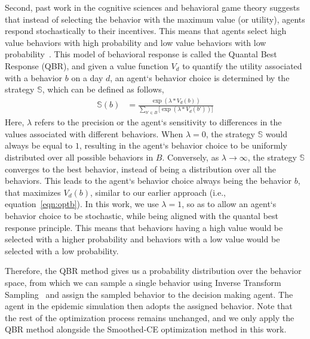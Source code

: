\documentclass[doublespace]{VTthesis}
\begin{document}
    Second, past work in the cognitive sciences and behavioral game theory suggests that instead of selecting the behavior with the maximum value (or utility), agents respond stochastically to their incentives. This means that agents select high value behaviors with high probability and low value behaviors with low probability~\cite{wright2014level}. This model of behavioral response is called the Quantal Best Response (QBR), and given a value function $V_d$ to quantify the utility associated with a behavior $b$ on a day $d$, an agent`s behavior choice is determined by the strategy $\mathbb{S}$, which can be defined as follows,
    \begin{align}
        \mathbb{S}(b) &= \frac{\exp (\lambda * V_d(b)) }{ \sum\limits_{b' \in B} \big[ \exp(\lambda * V_d(b')) \big]}
    	\label{eqn:qbr}
    \end{align}
    Here, $\lambda$ refers to the precision or the agent`s sensitivity to differences in the values associated with different behaviors. When $\lambda = 0$, the strategy $\mathbb{S}$ would always be equal to $1$, resulting in the agent`s behavior choice to be uniformly distributed over all possible behaviors in $B$. Conversely, as $\lambda \rightarrow \infty$, the strategy $\mathbb{S}$ converges to the best behavior, instead of being a distribution over all the behaviors. This leads to the agent`s behavior choice always being the behavior $b$, that maximizes $V_d(b)$, similar to our earlier approach (i.e., equation~\ref{eqn:optb}). In this work, we use $\lambda = 1$, so as to allow an agent`s behavior choice to be stochastic, while being aligned with the quantal best response principle. This means that behaviors having a high value would be selected with a higher probability and behaviors with a low value would be selected with a low probability.
    
    Therefore, the QBR method gives us a probability distribution over the behavior space, from which we can sample a single behavior using Inverse Transform Sampling~\cite{wiki:its} and assign the sampled behavior to the decision making agent. The agent in the epidemic simulation then adopts the assigned behavior. Note that the rest of the optimization process remains unchanged, and we only apply the QBR method alongside the Smoothed-CE optimization method in this work. 
    
\end{document}
